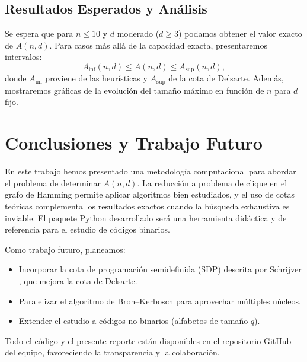 \documentclass[12pt, spanish]{article}
\begin{document}
\subsection{Resultados Esperados y Análisis}
Se espera que para $n \le 10$ y $d$ moderado ($d \ge 3$) podamos obtener el valor exacto de $A(n,d)$. Para casos más allá de la capacidad exacta, presentaremos intervalos:
\[
A_{\text{inf}}(n,d) \le A(n,d) \le A_{\text{sup}}(n,d),
\]
donde $A_{\text{inf}}$ proviene de las heurísticas y $A_{\text{sup}}$ de la cota de Delsarte. Además, mostraremos gráficas de la evolución del tamaño máximo en función de $n$ para $d$ fijo.

\section{Conclusiones y Trabajo Futuro}
\label{sec:conclusion}
En este trabajo hemos presentado una metodología computacional para abordar el problema de determinar $A(n,d)$. La reducción a problema de clique en el grafo de Hamming permite aplicar algoritmos bien estudiados, y el uso de cotas teóricas complementa los resultados exactos cuando la búsqueda exhaustiva es inviable. El paquete Python desarrollado será una herramienta didáctica y de referencia para el estudio de códigos binarios.

Como trabajo futuro, planeamos:
\begin{itemize}
    \item Incorporar la cota de programación semidefinida (SDP) descrita por Schrijver \cite{schrijver2005}, que mejora la cota de Delsarte.
    \item Paralelizar el algoritmo de Bron–Kerbosch para aprovechar múltiples núcleos.
    \item Extender el estudio a códigos no binarios (alfabetos de tamaño $q$).
\end{itemize}
Todo el código y el presente reporte están disponibles en el repositorio GitHub del equipo, favoreciendo la transparencia y la colaboración.
\end{document}
